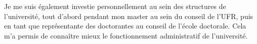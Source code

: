 \documentclass[a4paper,11pt]{article} %
\newcommand{\pointmedian}{\fontfamily{cmr}\selectfont\textperiodcentered}
\begin{document}
	Je me suis également investie personnellement au sein des structures de l'université, tout d'abord pendant mon master au sein du conseil de l'UFR, puis en tant que représentante des doctorant\pointmedian es au conseil de l'école doctorale. Cela m'a permis de connaître mieux le fonctionnement administratif de l'université.
	
	
\end{document}
